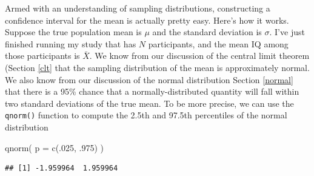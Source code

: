 \documentclass[
]{book}
\newenvironment{Shaded}{\begin{snugshade}}{\end{snugshade}}
\newcommand{\AttributeTok}[1]{\textcolor[rgb]{0.77,0.63,0.00}{#1}}
\newcommand{\DecValTok}[1]{\textcolor[rgb]{0.00,0.00,0.81}{#1}}
\newcommand{\FunctionTok}[1]{\textcolor[rgb]{0.00,0.00,0.00}{#1}}
\newcommand{\NormalTok}[1]{#1}
\begin{document}
Armed with an understanding of sampling distributions, constructing a confidence interval for the mean is actually pretty easy. Here's how it works. Suppose the true population mean is \(\mu\) and the standard deviation is \(\sigma\). I've just finished running my study that has \(N\) participants, and the mean IQ among those participants is \(\bar{X}\). We know from our discussion of the central limit theorem (Section \ref{clt} that the sampling distribution of the mean is approximately normal. We also know from our discussion of the normal distribution Section \ref{normal} that there is a 95\% chance that a normally-distributed quantity will fall within two standard deviations of the true mean. To be more precise, we can use the \texttt{qnorm()} function to compute the 2.5th and 97.5th percentiles of the normal distribution

\begin{Shaded}
\begin{Highlighting}[]
\FunctionTok{qnorm}\NormalTok{( }\AttributeTok{p =} \FunctionTok{c}\NormalTok{(.}\DecValTok{025}\NormalTok{, .}\DecValTok{975}\NormalTok{) )}
\end{Highlighting}
\end{Shaded}

\begin{verbatim}
## [1] -1.959964  1.959964
\end{verbatim}
\end{document}
